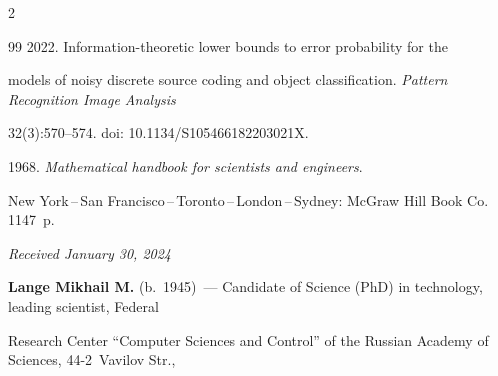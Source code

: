 \begin{multicols}{2}
{{\begin{thebibliography}{99}
 2022. Information-theoretic lower bounds to error probability for the 


models of noisy discrete source coding and object classification. \textit{Pattern Recognition Image Analysis} 


32(3):570--574. doi: 10.1134/S105466182203021X.




 1968. \textit{Mathematical handbook for scientists and engineers}.  


New York\,--\,San Francisco\,--\,Toronto\,--\,London\,--\,Sydney: McGraw Hill Book Co. 1147~p. 





\end{thebibliography}





 }


 }





\end{multicols}





\vspace*{-6pt}





\hfill{\small\textit{Received January 30, 2024}} 





\vspace*{-12pt}








\Contr





\vspace*{-3pt}





\noindent


\textbf{Lange Mikhail M.} (b.\ 1945)~--- Candidate of Science (PhD) in technology, leading scientist, Federal 


Research Center ``Computer Sciences and Control'' of the Russian Academy of Sciences, 44-2~Vavilov Str., 


